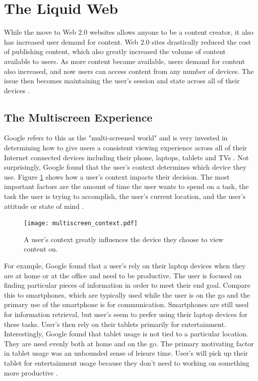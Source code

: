 \documentclass[12pt]{article}
\begin{document}
\section{The Liquid Web}
While the move to Web 2.0 websites allows anyone to be a content creator, it also has increased user demand for content.  Web 2.0 sites drastically reduced the cost of publishing content, which also greatly increased the volume of content available to users.  As more content became available, users demand for content also increased, and now users can access content from any number of devices.  The issue then becomes maintaining the user's session and state across all of their devices \cite{liquid_web}.


\subsection{The Multiscreen Experience}
Google refers to this as the "multi-screened world" and is very invested in determining how to give users a consistent viewing experience across all of their Internet connected devices including their phone, laptops, tablets and TVs \cite{google_multi_screen}.  Not surprisingly, Google found that the user's context determines which device they use.  Figure \ref{fig:multiscreen_context} shows how a user's context impacts their decision.  The most important factors are the amount of time the user wants to spend on a task, the task the user is trying to accomplish, the user's current location, and the user's attitude or state of mind \cite{google_multi_screen}.

\begin{figure}[H]
  \begin{center}
    \texttt{[image: multiscreen\_context.pdf]}
    \caption{A user's context greatly influences the device they choose to view content on.}
    \label{fig:multiscreen_context}
  \end{center}
\end{figure}

For example, Google found that a user's rely on their laptop devices when they are at home or at the office and need to be productive.  The user is focused on finding particular pieces of information in order to meet their end goal.  Compare this to smartphones, which are typically used while the user is on the go and the primary use of the smartphone is for communication.  Smartphones are still used for information retrieval, but user's seem to prefer using their laptop devices for these tasks.  User's then rely on their tablets primarily for entertainment.  Interestingly, Google found that tablet usage is not tied to a particular location.  They are used evenly both at home and on the go.  The primary motivating factor in tablet usage was an unbounded sense of leisure time.  User's will pick up their tablet for entertainment usage because they don't need to working on something more productive \cite{google_multi_screen}.
\end{document}
